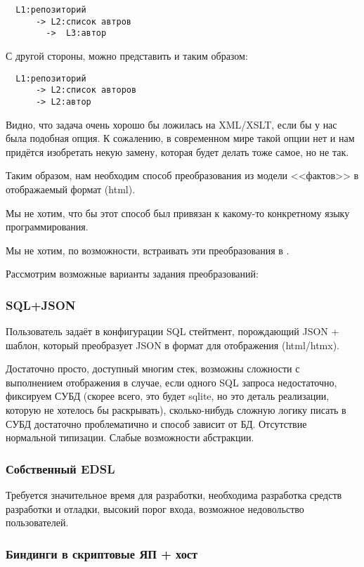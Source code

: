 \begin{verbatim}
  L1:репозиторий
      -> L2:список автров
        ->  L3:автор
\end{verbatim}

С другой стороны, можно представить и таким образом:

\begin{verbatim}
  L1:репозиторий
      -> L2:список авторов
      -> L2:автор
\end{verbatim}


Видно, что задача очень хорошо бы ложилась на XML/XSLT, если бы у нас
была подобная опция.  К сожалению, в современном мире такой опции нет
и нам придётся изобретать некую замену, которая будет делать тоже
самое, но не так.


Таким образом, нам необходим способ преобразования из модели
<<фактов>> в отображаемый формат (html).

Мы не хотим, что бы этот способ был привязан к какому-то конкретному
языку программирования.

Мы не хотим, по возможности, встраивать эти преобразования в
.


Рассмотрим возможные варианты задания преобразований:

\subsubsection{SQL+JSON}

Пользователь задаёт в конфигурации SQL стейтмент, порождающий JSON +
шаблон, который преобразует JSON в формат для отображения (html/htmx).

Достаточно просто, доступный многим стек, возможны сложности с
выполнением отображения в случае, если одного SQL запроса
недостаточно, фиксируем СУБД (скорее всего, это будет sqlite, но это
деталь реализации, которую не хотелось бы раскрывать), сколько-нибудь
сложную логику писать в СУБД достаточно проблематично и способ зависит
от БД. Отсутствие нормальной типизации. Слабые возможности абстракции.


\subsubsection{Собственный EDSL}

Требуется значительное время для разработки, необходима разработка
средств разработки и отладки, высокий порог входа, возможное
недовольство пользователей.


\subsubsection{Биндинги в скриптовые ЯП + хост}

